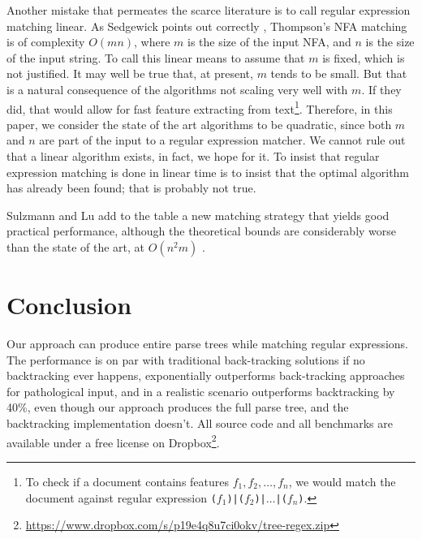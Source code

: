 \documentclass[english]{sigplanconf}
\theoremstyle{definition}
\begin{document}
Another mistake that permeates the scarce literature is to call
regular expression matching linear. As Sedgewick points out correctly
\cite{Sedg90a}, Thompson's NFA matching is of complexity $O(mn)$,
where $m$ is the size of the input NFA, and $n$ is the size of the
input string. To call this linear means to assume that $m$ is fixed,
which is not justified. It may well be true that, at present, $m$
tends to be small. But that is a natural consequence of the algorithms
not scaling very well with $m$. If they did, that would allow for
fast feature extracting from text\footnote{To check if a document
contains features $f_1, f_2, \dots, f_n$, we would match the document
against regular expression \texttt{($f_1$)|($f_2$)|$\dots$|($f_n$)}.}.
Therefore, in this paper, we consider the state of the art algorithms
to be quadratic, since both $m$ and $n$ are part of the input to a
regular expression matcher. We cannot rule out that a linear algorithm
exists, in fact, we hope for it.  To insist that regular expression
matching is done in linear time is to insist that the optimal
algorithm has already been found; that is probably not true.

Sulzmann and Lu add to the table a new matching strategy that yields
good practical performance, although the theoretical bounds are considerably
worse than the state of the art, at $O(n^{2}m)$ \cite{Sulz12a}.

\section{Conclusion}
Our approach can produce entire parse trees while matching regular
expressions.  The performance is on par with traditional back-tracking
solutions if no backtracking ever happens, exponentially outperforms
back-tracking approaches for pathological input, and in a realistic
scenario outperforms backtracking by 40\%, even though our approach 
produces the full parse tree, and the backtracking implementation doesn't.
All source code and all
benchmarks are available under a free license on
Dropbox\footnote{\url{https://www.dropbox.com/s/p19e4q8u7ci0okv/tree-regex.zip}}.



\end{document}
